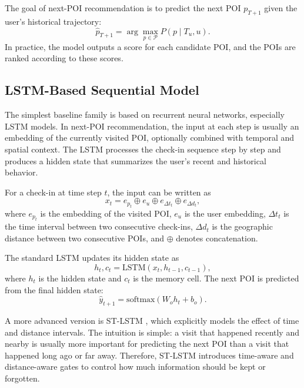 \documentclass[12pt, journal]{IEEEtran}
\begin{document}
The goal of next-POI recommendation is to predict the next POI $p_{T+1}$ given the user's historical trajectory:
\begin{equation}
    \hat{p}_{T+1} = \arg\max_{p \in \mathcal{P}} P(p \mid T_u, u).
\end{equation}
In practice, the model outputs a score for each candidate POI, and the POIs are ranked according to these scores.

\subsection{LSTM-Based Sequential Model}

The simplest baseline family is based on recurrent neural networks, especially LSTM models. In next-POI recommendation, the input at each step is usually an embedding of the currently visited POI, optionally combined with temporal and spatial context. The LSTM processes the check-in sequence step by step and produces a hidden state that summarizes the user's recent and historical behavior.

For a check-in at time step $t$, the input can be written as
\begin{equation}
    x_t = e_{p_t} \oplus e_{u} \oplus e_{\Delta t_t} \oplus e_{\Delta d_t},
\end{equation}
where $e_{p_t}$ is the embedding of the visited POI, $e_u$ is the user embedding, $\Delta t_t$ is the time interval between two consecutive check-ins, $\Delta d_t$ is the geographic distance between two consecutive POIs, and $\oplus$ denotes concatenation.

The standard LSTM updates its hidden state as
\begin{equation}
    h_t, c_t = \mathrm{LSTM}(x_t, h_{t-1}, c_{t-1}),
\end{equation}
where $h_t$ is the hidden state and $c_t$ is the memory cell. The next POI is predicted from the final hidden state:
\begin{equation}
    \hat{y}_{t+1} = \mathrm{softmax}(W_o h_t + b_o).
\end{equation}

A more advanced version is ST-LSTM \cite{zhao2018nextspatiotemporallstmmodel}, which explicitly models the effect of time and distance intervals. The intuition is simple: a visit that happened recently and nearby is usually more important for predicting the next POI than a visit that happened long ago or far away. Therefore, ST-LSTM introduces time-aware and distance-aware gates to control how much information should be kept or forgotten.
\end{document}
